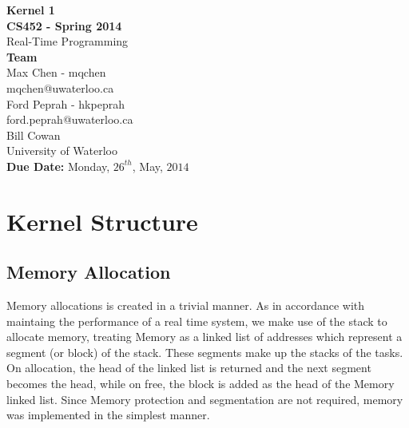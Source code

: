 \documentclass[12pt]{article}
\begin{document}
\thispagestyle{empty}
\begin{center}
  {\bf\Large Kernel 1}\\
  {\bf\large CS452 - Spring 2014}\\
  Real-Time Programming\vspace{5cm}\\
  {\bf Team }\\
  Max Chen - mqchen\\
  mqchen@uwaterloo.ca\\[1\baselineskip]
  Ford Peprah - hkpeprah\\
  ford.peprah@uwaterloo.ca\vspace{5cm}\\
  Bill Cowan\\
  University of Waterloo\\
  {\bf Due Date:} Monday, $26^{th}$, May, $2014$
\end{center}
\newpage
\thispagestyle{empty}
\tableofcontents
\newpage
\section{Kernel Structure}
\subsection{Memory Allocation}
Memory allocations is created in a trivial manner.  As in accordance with maintaing the performance of a real time system, we make use of the stack to allocate memory, treating Memory as a linked list of addresses which represent a segment (or block) of the stack.  These segments make up the stacks of the tasks.  On allocation, the head of the linked list is returned and the next segment becomes the head, while on free, the block is added as the head of the Memory linked list.  Since Memory protection and segmentation are not required, memory was implemented in the simplest manner.
\\[1\baselineskip]
\end{document}
